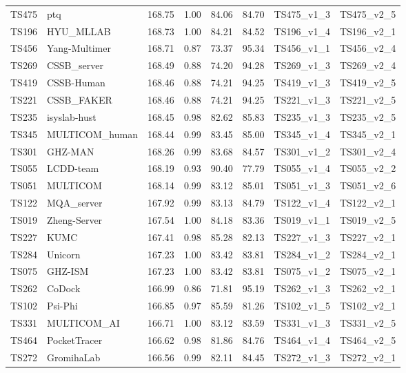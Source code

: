 \begin{longtable}{llllllll}
TS475 & ptq & 168.75 & 1.00 & 84.06 & 84.70 & TS475\_v1\_3 & TS475\_v2\_5 \\ 
TS196 & HYU\_MLLAB & 168.73 & 1.00 & 84.21 & 84.52 & TS196\_v1\_4 & TS196\_v2\_1 \\ 
TS456 & Yang-Multimer & 168.71 & 0.87 & 73.37 & 95.34 & TS456\_v1\_1 & TS456\_v2\_4 \\ 
TS269 & CSSB\_server & 168.49 & 0.88 & 74.20 & 94.28 & TS269\_v1\_3 & TS269\_v2\_4 \\ 
TS419 & CSSB-Human & 168.46 & 0.88 & 74.21 & 94.25 & TS419\_v1\_3 & TS419\_v2\_5 \\ 
TS221 & CSSB\_FAKER & 168.46 & 0.88 & 74.21 & 94.25 & TS221\_v1\_3 & TS221\_v2\_5 \\ 
TS235 & isyslab-hust & 168.45 & 0.98 & 82.62 & 85.83 & TS235\_v1\_3 & TS235\_v2\_5 \\ 
TS345 & MULTICOM\_human & 168.44 & 0.99 & 83.45 & 85.00 & TS345\_v1\_4 & TS345\_v2\_1 \\ 
TS301 & GHZ-MAN & 168.26 & 0.99 & 83.68 & 84.57 & TS301\_v1\_2 & TS301\_v2\_4 \\ 
TS055 & LCDD-team & 168.19 & 0.93 & 90.40 & 77.79 & TS055\_v1\_4 & TS055\_v2\_2 \\ 
TS051 & MULTICOM & 168.14 & 0.99 & 83.12 & 85.01 & TS051\_v1\_3 & TS051\_v2\_6 \\ 
TS122 & MQA\_server & 167.92 & 0.99 & 83.13 & 84.79 & TS122\_v1\_4 & TS122\_v2\_1 \\ 
TS019 & Zheng-Server & 167.54 & 1.00 & 84.18 & 83.36 & TS019\_v1\_1 & TS019\_v2\_5 \\ 
TS227 & KUMC & 167.41 & 0.98 & 85.28 & 82.13 & TS227\_v1\_3 & TS227\_v2\_1 \\ 
TS284 & Unicorn & 167.23 & 1.00 & 83.42 & 83.81 & TS284\_v1\_2 & TS284\_v2\_1 \\ 
TS075 & GHZ-ISM & 167.23 & 1.00 & 83.42 & 83.81 & TS075\_v1\_2 & TS075\_v2\_1 \\ 
TS262 & CoDock & 166.99 & 0.86 & 71.81 & 95.19 & TS262\_v1\_3 & TS262\_v2\_1 \\ 
TS102 & Psi-Phi & 166.85 & 0.97 & 85.59 & 81.26 & TS102\_v1\_5 & TS102\_v2\_1 \\ 
TS331 & MULTICOM\_AI & 166.71 & 1.00 & 83.12 & 83.59 & TS331\_v1\_3 & TS331\_v2\_5 \\ 
TS464 & PocketTracer & 166.62 & 0.98 & 81.86 & 84.76 & TS464\_v1\_4 & TS464\_v2\_5 \\ 
TS272 & GromihaLab & 166.56 & 0.99 & 82.11 & 84.45 & TS272\_v1\_3 & TS272\_v2\_1 \\ 

\end{longtable}
